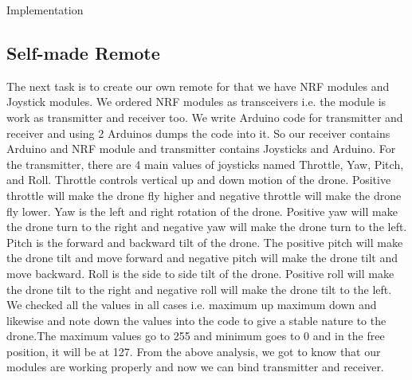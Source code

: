 \documentclass[12pt, oneside]{report}
\numberwithin{equation}{section}
\begin{document}
\begin{chapter}{Implementation}

\subsection{Self-made Remote}
The next task is to create our own remote for that we have NRF modules and Joystick modules. We ordered NRF modules as transceivers i.e. the module is work as transmitter and receiver too. We write Arduino code for transmitter and receiver and using 2 Arduinos dumps the code into it. So our receiver contains Arduino and NRF module and transmitter contains Joysticks and Arduino. For the transmitter, there are 4 main values of joysticks named Throttle, Yaw, Pitch, and Roll. Throttle controls vertical up and down motion of the drone. Positive throttle will make the drone fly higher and negative throttle will make the drone fly lower. Yaw is the left and right rotation of the drone. Positive yaw will make the drone turn to the right and negative yaw will make the drone turn to the left. Pitch is the forward and backward tilt of the drone. The positive pitch will make the drone tilt and move forward and negative pitch will make the drone tilt and move backward. Roll is the side to side tilt of the drone. Positive roll will make the drone tilt to the right and negative roll will make the drone tilt to the left. We checked all the values in all cases i.e. maximum up maximum down and likewise and note down the values into the code to give a stable nature to the drone.The maximum values go to 255 and minimum goes to 0 and in the free position, it will be at 127. From the above analysis, we got to know that our modules are working properly and now we can bind transmitter and receiver. \\


\end{chapter}
\end{document}
